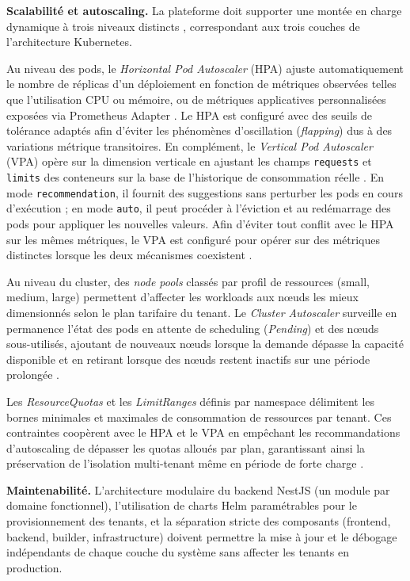 \textbf{Scalabilité et autoscaling.} La plateforme doit supporter une montée en charge dynamique à trois niveaux distincts \cite{k8s-autoscaling}, correspondant aux trois couches de l'architecture Kubernetes.

Au niveau des pods, le \textit{Horizontal Pod Autoscaler} (HPA) ajuste automatiquement le nombre de réplicas d'un déploiement en fonction de métriques observées telles que l'utilisation CPU ou mémoire, ou de métriques applicatives personnalisées exposées via Prometheus Adapter \cite{k8s-hpa}. Le HPA est configuré avec des seuils de tolérance adaptés afin d'éviter les phénomènes d'oscillation (\textit{flapping}) dus à des variations métrique transitoires. En complément, le \textit{Vertical Pod Autoscaler} (VPA) opère sur la dimension verticale en ajustant les champs \texttt{requests} et \texttt{limits} des conteneurs sur la base de l'historique de consommation réelle \cite{kubecost-vpa}. En mode \texttt{recommendation}, il fournit des suggestions sans perturber les pods en cours d'exécution ; en mode \texttt{auto}, il peut procéder à l'éviction et au redémarrage des pods pour appliquer les nouvelles valeurs. Afin d'éviter tout conflit avec le HPA sur les mêmes métriques, le VPA est configuré pour opérer sur des métriques distinctes lorsque les deux mécanismes coexistent \cite{k8s-hpa-vpa-conflict}.

Au niveau du cluster, des \textit{node pools} classés par profil de ressources (small, medium, large) permettent d'affecter les workloads aux nœuds les mieux dimensionnés selon le plan tarifaire du tenant. Le \textit{Cluster Autoscaler} surveille en permanence l'état des pods en attente de scheduling (\textit{Pending}) et des nœuds sous-utilisés, ajoutant de nouveaux nœuds lorsque la demande dépasse la capacité disponible et en retirant lorsque des nœuds restent inactifs sur une période prolongée \cite{k8s-autoscaling}.

Les \textit{ResourceQuotas} et les \textit{LimitRanges} définis par namespace délimitent les bornes minimales et maximales de consommation de ressources par tenant. Ces contraintes coopèrent avec le HPA et le VPA en empêchant les recommandations d'autoscaling de dépasser les quotas alloués par plan, garantissant ainsi la préservation de l'isolation multi-tenant même en période de forte charge \cite{microsoft-tenancy}.

\textbf{Maintenabilité.} L'architecture modulaire du backend NestJS (un module par domaine fonctionnel), l'utilisation de charts Helm paramétrables pour le provisionnement des tenants, et la séparation stricte des composants (frontend, backend, builder, infrastructure) doivent permettre la mise à jour et le débogage indépendants de chaque couche du système sans affecter les tenants en production.

